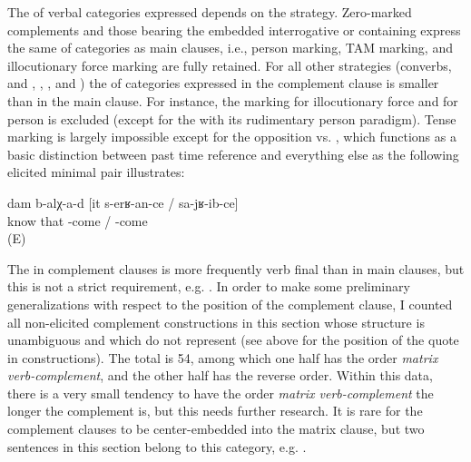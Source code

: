 The  of verbal categories expressed depends on the  strategy. Zero-marked complements and those bearing the embedded interrogative  or containing   express the same  of categories as main clauses, i.e., person marking, TAM marking, and illocutionary force marking are fully retained. For all other strategies (converbs,   and , , , and ) the  of categories expressed in the complement clause is smaller than in the main clause. For instance, the marking for illocutionary force and for person is excluded (except for the  with its rudimentary person paradigm). Tense marking is largely impossible except for the opposition  vs. , which functions as a basic distinction between past time reference and everything else as the following elicited minimal pair illustrates:
%
\begin{exe}
	\ex	\label{ex:‎I know that he will come / came}
	\gll	dam	b-alχ-a-d	[it	s-erʁ-an-ce	/	sa-jʁ-ib-ce]\\
			know	that	-come	/	-come\\
	\glt	{} (E)
\end{exe}

The  in complement clauses is more frequently verb final than in main clauses, but this is not a strict requirement, e.g. . In order to make some preliminary generalizations with respect to the position of the complement clause, I counted all non-elicited complement constructions in this section whose structure is unambiguous and which do not represent  (see  above for the position of the quote in  constructions). The total  is 54, among which one half has the order \textit{matrix verb-complement}, and the other half has the reverse order. Within this data, there is a very small tendency to have the order \textit{matrix verb-complement} the longer the complement is, but this needs further research. It is rare for the complement clauses to be center-embedded into the matrix clause, but two sentences in this section belong to this category, e.g. .

